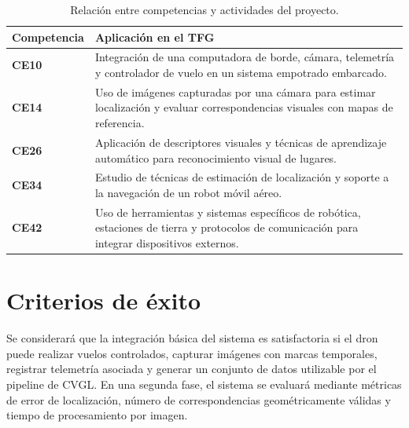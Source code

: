 \begin{table}[htbp]
\centering
\caption{Relación entre competencias y actividades del proyecto.}
\label{tab:competencias}
\begin{tabularx}{\textwidth}{>{\bfseries}p{}X}
\toprule
Competencia & Aplicación en el TFG \\
\midrule
CE10 & Integración de una computadora de borde, cámara, telemetría y controlador de vuelo en un sistema empotrado embarcado. \\
CE14 & Uso de imágenes capturadas por una cámara para estimar localización y evaluar correspondencias visuales con mapas de referencia. \\
CE26 & Aplicación de descriptores visuales y técnicas de aprendizaje automático para reconocimiento visual de lugares. \\
CE34 & Estudio de técnicas de estimación de localización y soporte a la navegación de un robot móvil aéreo. \\
CE42 & Uso de herramientas y sistemas específicos de robótica, estaciones de tierra y protocolos de comunicación para integrar dispositivos externos. \\
\bottomrule
\end{tabularx}
\end{table}

\section{Criterios de éxito}
\label{sec:criterios-exito}

Se considerará que la integración básica del sistema es satisfactoria si el dron puede realizar vuelos controlados, capturar imágenes con marcas temporales, registrar telemetría asociada y generar un conjunto de datos utilizable por el pipeline de CVGL. En una segunda fase, el sistema se evaluará mediante métricas de error de localización, número de correspondencias geométricamente válidas y tiempo de procesamiento por imagen.

